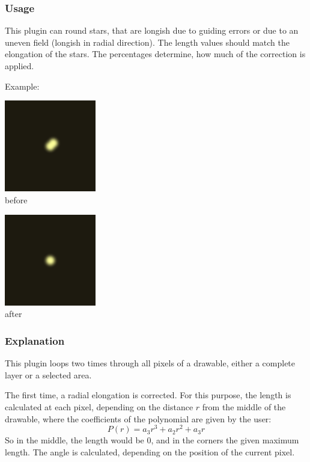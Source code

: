 \documentclass[a4paper]{article}
\begin{document}
\subsubsection{Usage}

This plugin can round stars, that are longish due to guiding errors or due to an uneven field (longish in radial direction).
The length values should match the elongation of the stars. The percentages determine, how much of the correction is applied.

Example:
\begin{multicols}{2}{
\begin{center}
\includegraphics[width=0.3\textwidth]{star_rounding_long.png} \\
before
\end{center}

\begin{center}
\includegraphics[width=0.3\textwidth]{star_rounding_rounded.png} \\
after
\end{center}
}\end{multicols}

\subsubsection{Explanation}

This plugin loops two times through all pixels of a drawable, either a complete layer or a selected area.

The first time, a radial elongation is corrected.
For this purpose, the length is calculated at each pixel, depending on the distance $r$ from the middle of the drawable, where the coefficients of the polynomial are given by the user:
$$P(r) = a_3 r^3 + a_2 r^2 + a_3 r$$
So in the middle, the length would be $0$, and in the corners the given maximum length.
The angle is calculated, depending on the position of the current pixel.
\end{document}
